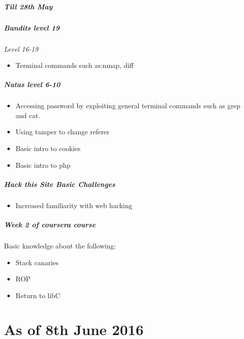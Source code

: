 \documentclass{article}
\begin{document}
\subparagraph{\textit{Till 28th May}}
\subparagraph{Bandits level 19}
    \textit{Level 16-19}
    \begin{itemize}
        \item Terminal commands such as:nmap, diff
    \end{itemize}

\subparagraph{Natas level 6-10}
    \begin{itemize}
        \item Accessing password by exploiting general terminal commands such as grep and cat.
        \item Using tamper to change referer 
        \item Basic intro to cookies
        \item Basic intro to php
    \end{itemize}    
\subparagraph{Hack this Site Basic Challenges}
    \begin{itemize}
        \item Increased familiarity with web hacking
    \end{itemize} 
\subparagraph{Week 2 of coursera course}
    Basic knowledge about the following:
    \begin{itemize}
        \item Stack canaries
        \item ROP
        \item Return to libC
    \end{itemize} 

\newpage
\section*{As of 8th June 2016}
\end{document}
